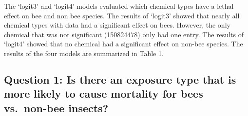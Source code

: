 \documentclass[
  12pt,
]{article}
\newenvironment{Shaded}{\begin{snugshade}}{\end{snugshade}}
\newcommand{\AttributeTok}[1]{\textcolor[rgb]{0.77,0.63,0.00}{#1}}
\newcommand{\CommentTok}[1]{\textcolor[rgb]{0.56,0.35,0.01}{\textit{#1}}}
\newcommand{\DecValTok}[1]{\textcolor[rgb]{0.00,0.00,0.81}{#1}}
\newcommand{\FunctionTok}[1]{\textcolor[rgb]{0.00,0.00,0.00}{#1}}
\newcommand{\NormalTok}[1]{#1}
\newcommand{\OtherTok}[1]{\textcolor[rgb]{0.56,0.35,0.01}{#1}}
\newcommand{\SpecialCharTok}[1]{\textcolor[rgb]{0.00,0.00,0.00}{#1}}
\newcommand{\StringTok}[1]{\textcolor[rgb]{0.31,0.60,0.02}{#1}}
\begin{document}
The `logit3' and `logit4' models evaluated which chemical types have a
lethal effect on bee and non bee species. The results of `logit3' showed
that nearly all chemical types with data had a significant effect on
bees. However, the only chemical that was not significant (150824478)
only had one entry. The results of `logit4' showed that no chemical had
a significant effect on non-bee species. The results of the four models
are summarized in Table 1.

\hypertarget{question-1-is-there-an-exposure-type-that-is-more-likely-to-cause-mortality-for-bees-vs.-non-bee-insects}{%
\subsection{Question 1: Is there an exposure type that is more likely to
cause mortality for bees vs.~non-bee
insects?}\label{question-1-is-there-an-exposure-type-that-is-more-likely-to-cause-mortality-for-bees-vs.-non-bee-insects}}

\begin{Shaded}
\end{Shaded}
\end{document}
